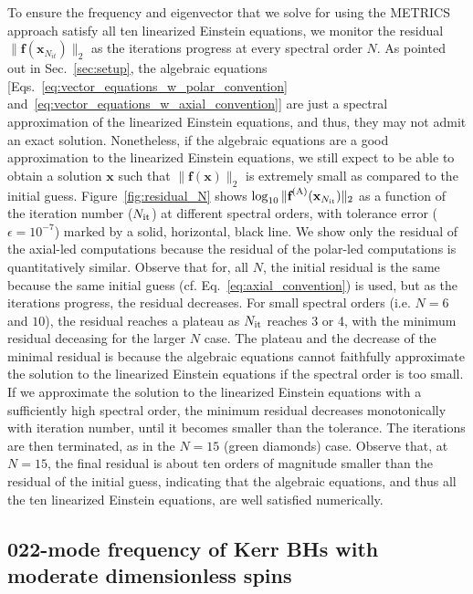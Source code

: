 \documentclass[aps,prx,amsmath,floats,floatfix,twocolumn,
  superscriptaddress,nofootinbib,showpacs]{revtex4-1}
\begin{document}
To ensure the frequency and eigenvector that we solve for using the METRICS approach satisfy all ten linearized Einstein equations, we monitor the residual $\| \textbf{f}(\textbf{x}_{N_{it}}) \|_2$ as the iterations progress at every spectral order $N$.  
As pointed out in Sec.~\ref{sec:setup}, the algebraic equations [Eqs.~\eqref{eq:vector_equations_w_polar_convention} and~\eqref{eq:vector_equations_w_axial_convention}] are just a spectral approximation of the linearized Einstein equations, and thus, they may not admit an exact solution. 
Nonetheless, if the algebraic equations are a good approximation to the linearized Einstein equations, we still expect to be able to obtain a solution $\textbf{x}$ such that $\| \textbf{f}(\textbf{x})\|_2 $ is extremely small as compared to the initial guess.
Figure~\ref{fig:residual_N} shows $\log_{10} \| \textbf{f}^{\rm (A)}(\textbf{x}_{N_{\rm it}})\|_2$ as a function of the iteration number ($N_{\rm it}$) at different spectral orders, with tolerance error ($\epsilon = 10^{-7}$) marked by a solid, horizontal, black line. 
We show only the residual of the axial-led computations because the residual of the polar-led computations is quantitatively similar. 
Observe that for, all $N$, the initial residual is the same because the same initial guess (cf. Eq.~\eqref{eq:axial_convention}) is used, but as the iterations progress, the residual decreases. 
For small spectral orders (i.e. $N = 6 $ and $10$), the residual reaches a plateau as $N_{\rm it} $ reaches 3 or 4, with the minimum residual deceasing for the larger $N$ case.
The plateau and the decrease of the minimal residual is because the algebraic equations cannot faithfully approximate the solution to the linearized Einstein equations if the spectral order is too small. 
If we approximate the solution to the linearized Einstein equations with a sufficiently high spectral order, the minimum residual decreases monotonically with iteration number, until it becomes smaller than the tolerance. 
The iterations are then terminated, as in the $N=15$ (green diamonds) case. 
Observe that, at $N=15$, the final residual is about ten orders of magnitude smaller than the residual of the initial guess, indicating that the algebraic equations, and thus all the ten linearized Einstein equations, are well satisfied numerically. 

\subsection{022-mode frequency of Kerr BHs with moderate dimensionless spins}
\end{document}
